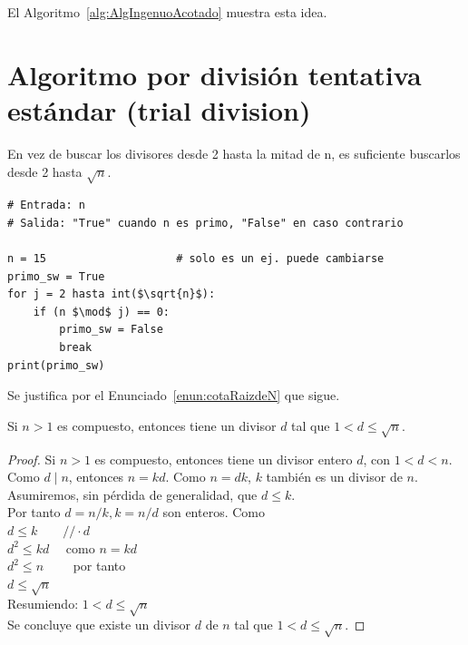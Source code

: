 \noindent El Algoritmo~\ref{alg:AlgIngenuoAcotado} muestra esta idea.

\section{Algoritmo por división tentativa estándar (trial division)}
En vez de buscar los divisores desde 2 hasta la  mitad de n, es suficiente buscarlos desde 2 hasta $\sqrt{n}$.

\begin{lstlisting}[caption={Algoritmo de testeo de primalidad por división tentativa estándar}, label={alg:AlgTrialDivision}, mathescape=true]
# Entrada: n
# Salida: "True" cuando n es primo, "False" en caso contrario

n = 15                    # solo es un ej. puede cambiarse
primo_sw = True 
for j = 2 hasta int($\sqrt{n}$): 
    if (n $\mod$ j) == 0:        
        primo_sw = False
        break               
print(primo_sw)
\end{lstlisting}

\vspace{\baselineskip}
\noindent Se justifica por el Enunciado~\ref{enun:cotaRaizdeN} que sigue.

\begin{enunciado} \label{enun:cotaRaizdeN}\leavevmode\par Si $n > 1$ es compuesto, entonces tiene un divisor $d$ tal que $1 < d \leq \sqrt{n}$.
\end{enunciado}

\begin{proof} Si $n > 1$ es compuesto, entonces tiene un divisor entero $d$, con $1 < d < n$. \\ 
Como $d \mid n$, entonces $n = kd$. Como $n = dk$, $k$ también es un divisor de $n$. \\ 
Asumiremos, sin pérdida de generalidad, que $d \leq k$. \\
Por tanto $d = n/k, k = n/d$ son enteros. Como  \\ 
$d \leq k \qquad //  \cdot d$ \\ 
$d^{2} \leq kd \quad$ como $n = kd$ \\
$d^{2} \leq n \qquad$  por tanto \\
$d \leq \sqrt{n}$ \\
Resumiendo: $1 < d  \leq \sqrt{n}$ \\ 
Se concluye que existe un divisor $d$ de $n$ tal que $1 < d \leq \sqrt{n}$. 
\end{proof}

